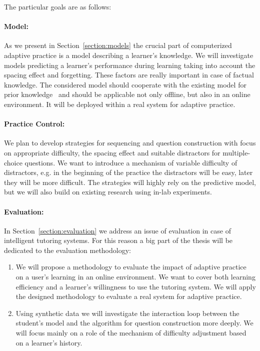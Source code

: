 \documentclass[table,color,cover,twoside,nolot,nolof]{fithesis3/fithesis3}
\begin{document}
The particular goals are as follows:

\vspace{-.3cm}
\paragraph*{Model:} As we present in Section~\ref{section:models} the crucial
part of computerized adaptive practice is a model describing a learner's
knowledge. We will investigate models predicting a learner's performance during
learning taking into account the spacing effect and forgetting. These factors
are really important in case of factual knowledge. The considered model should
cooperate with the existing model for prior knowledge~\cite{papousek2014adaptive}
and should be applicable not only offline, but also in an online environment. It
will be deployed within a real system for adaptive practice.

\vspace{-.3cm}
\paragraph{Practice Control:} We plan to develop strategies for sequencing and
question construction with focus on appropriate difficulty, the spacing effect
and suitable distractors for multiple-choice questions. We want to introduce a
mechanism of variable difficulty of distractors, e.g. in the beginning of the
practice the distractors will be easy, later they will be more difficult. The
strategies will highly rely on the predictive model, but we will also build on
existing research using in-lab experiments.

\vspace{-.3cm}
\paragraph{Evaluation:} In Section~\ref{section:evaluation} we address an issue
of evaluation in case of intelligent tutoring systems. For this reason a big
part of the thesis will be dedicated to the evaluation methodology:
\begin{enumerate}
	\item We will propose a methodology to evaluate the impact of adaptive
		practice on a user's learning in an online environment. We want to cover
		both learning efficiency and a learner's willingness to use the tutoring
		system.  We will apply the designed methodology to evaluate a real system
		for adaptive practice.
	\item Using synthetic data we will investigate the interaction loop
		between the student's model and the algorithm for question construction
		more deeply. We will focus mainly on a role of the mechanism of difficulty
		adjustment based on a learner's history.
\end{enumerate}
\end{document}
